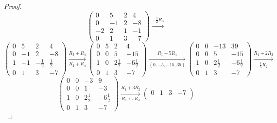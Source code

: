 \documentclass{article}
\begin{document}
\begin{enumerate}
\begin{proof}
\[            \begin{pmatrix}
                0  & 5   & 2 & 4  \\
                0  & - 1 & 2 & -8 \\
                -2 & 2   & 1 & -1 \\
                0  & 1   & 3 & -7
            \end{pmatrix} \xrightarrow{-\frac{1}{2}R_3}
        \]
        \[
            \begin{pmatrix}
                0 & 5   & 2            & 4           \\
                0 & - 1 & 2            & -8          \\
                1 & -1  & -\frac{1}{2} & \frac{1}{2} \\
                0 & 1   & 3            & -7
            \end{pmatrix} \xrightarrow[R_2 + R_4]{R_3 + R_4}
            \begin{pmatrix}
                0 & 5 & 2            & 4             \\
                0 & 0 & 5            & -15           \\
                1 & 0 & 2\frac{1}{2} & -6\frac{1}{2} \\
                0 & 1 & 3            & -7
            \end{pmatrix} \xrightarrow[(0,-5,-15,35)]{R_1 - 5R_4}
            \begin{pmatrix}
                0 & 0 & -13          & 39            \\
                0 & 0 & 5            & -15           \\
                1 & 0 & 2\frac{1}{2} & -6\frac{1}{2} \\
                0 & 1 & 3            & -7
            \end{pmatrix} \xrightarrow[\frac{1}{5}R_2]{R_1 + 2R_2}
        \]
        \[
            \begin{pmatrix}
                0 & 0 & -3           & 9             \\
                0 & 0 & 1            & -3            \\
                1 & 0 & 2\frac{1}{2} & -6\frac{1}{2} \\
                0 & 1 & 3            & -7
            \end{pmatrix} \xrightarrow[R_1 \leftrightarrow R_4]{R_1 + 3R_2}
            \begin{pmatrix}
                0 & 1 & 3            & -7            \\

\end{pmatrix}\]
\end{proof}
\end{enumerate}
\end{document}
